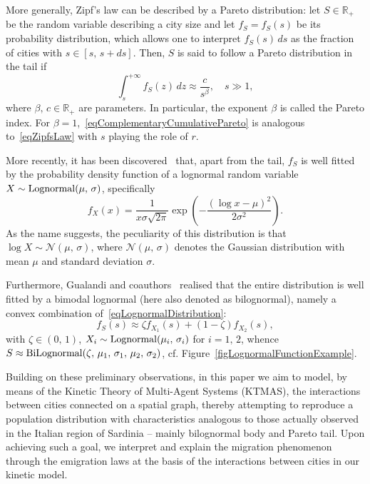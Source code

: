 \documentclass[a4paper]{article}
\newcommand{\R}{\mathbb{R}}
\begin{document}
More generally, Zipf's law can be described by a Pareto distribution: let $S\in\R_+$ be the random variable describing a city size and let $f_S=f_S(s)$ be its probability distribution, which allows one to interpret $f_S(s)\,ds$ as the fraction of cities with $s\in [s,\,s+ds]$. Then, $S$ is said to follow a Pareto distribution in the tail if
\begin{equation}
    \int_{s}^{+\infty}f_S(z)\,dz \approx \frac{c}{s^\beta}, \quad s\gg 1,
    \label{eqComplementaryCumulativePareto}
\end{equation}
where $\beta,\,c\in\R_+$ are parameters. In particular, the exponent $\beta$ is called the Pareto index. For $\beta=1$,~\eqref{eqComplementaryCumulativePareto} is analogous to~\eqref{eqZipfsLaw} with $s$ playing the role of $r$.
        
More recently, it has been discovered~\cite{Eeckhout2004,Gualandi2019HBLD} that, apart from the tail, $f_S$ is well fitted by the probability density function of a lognormal random variable $X\sim\operatorname{Lognormal}(\mu,\,\sigma)$, specifically
\begin{equation}
    f_X(x)=\frac1{x\sigma\sqrt{2\pi}}\exp\!\left(-\frac{(\log{x}-\mu)^2}{2\sigma^2}\right).
    \label{eqLognormalDistribution}
\end{equation}
As the name suggests, the peculiarity of this distribution is that $\log{X}\sim\mathcal{N}(\mu,\,\sigma)$, where $\mathcal{N}(\mu,\,\sigma)$ denotes the Gaussian distribution with mean $\mu$ and standard deviation $\sigma$.
        
Furthermore, Gualandi and coauthors~\cite{Gualandi2019HBLD,Gualandi2019SDC} realised that the entire distribution is well fitted by a bimodal lognormal (here also denoted as bilognormal), namely a convex combination of~\eqref{eqLognormalDistribution}:
\begin{equation}
    f_S(s)\approx \zeta f_{X_1}(s)+(1-\zeta)f_{X_2}(s),
    \label{eqBimodalLognormalDistribution}
\end{equation}
with $\zeta\in(0,\,1)$, $X_i\sim\operatorname{Lognormal}(\mu_i,\,\sigma_i)$ for $i=1,\,2$, whence $S\approx\operatorname{BiLognormal}(\zeta,\,\mu_1,\,\sigma_1,\,\mu_2,\,\sigma_2)$, cf. Figure~\ref{figLognormalFunctionExample}.
        
Building on these preliminary observations, in this paper we aim to model, by means of the Kinetic Theory of Multi-Agent Systems (KTMAS), the interactions between cities connected on a spatial graph, thereby attempting to reproduce a population distribution with characteristics analogous to those actually observed in the Italian region of Sardinia -- mainly bilognormal body and Pareto tail. Upon achieving such a goal, we interpret and explain the migration phenomenon through the emigration laws at the basis of the interactions between cities in our kinetic model.
        
\end{document}
